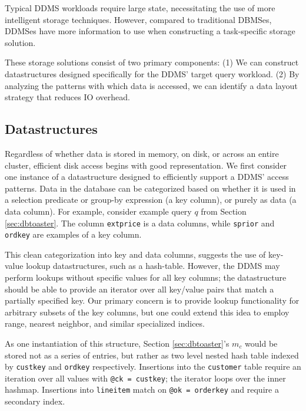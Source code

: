 Typical DDMS workloads require large state, necessitating the use of more intelligent storage techniques.  However, compared to traditional DBMSes, DDMSes have more information to use when constructing a task-specific storage solution.  

These storage solutions consist of two primary components: (1) We can construct datastructures designed specifically for the DDMS' target query workload. (2) By analyzing the patterns with which data is accessed, we can identify a data layout strategy that reduces IO overhead.

\subsection{Datastructures}
Regardless of whether data is stored in memory, on disk, or across an entire cluster, efficient disk access begins with good representation.  We first consider one instance of a datastructure designed to efficiently support a DDMS' access patterns.  Data in the database can be categorized based on whether it is used in a selection predicate or group-by expression (a key column), or purely as data (a data column).  For example, consider example query $q$ from Section \ref{sec:dbtoaster}.  The column \texttt{extprice} is a data columns, while \texttt{sprior} and \texttt{ordkey} are examples of a key column.  

This clean categorization into key and data columns, suggests the use of key-value lookup datastructures, such as a hash-table.  However, the DDMS may perform lookups without specific values for all key columns; the datastructure should be able to provide an iterator over all key/value pairs that match a partially specified key.  Our primary concern is to provide lookup functionality for arbitrary subsets of the key columns, but one could extend this idea to employ range, nearest neighbor, and similar specialized indices.  


As one instantiation of this structure, Section \ref{sec:dbtoaster}'s $m_c$ would be stored not as a series of entries, but rather as two level nested hash table indexed by \texttt{custkey} and \texttt{ordkey} respectively.  Insertions into the \texttt{customer} table require an iteration over all values with \texttt{@ck = custkey}; the iterator loops over the inner hashmap.  Insertions into \texttt{lineitem} match on \texttt{@ok = orderkey} and require a secondary index.  

